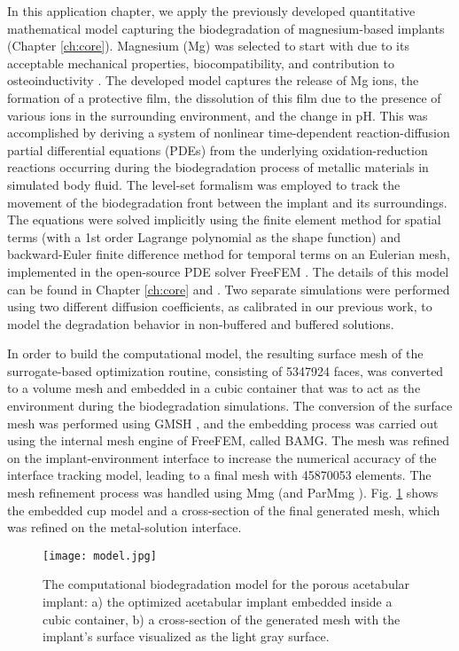 In this application chapter, we apply the previously developed quantitative mathematical model capturing the biodegradation of magnesium-based implants (Chapter \ref{ch:core}). Magnesium (Mg) was selected to start with due to its acceptable mechanical properties, biocompatibility, and contribution to osteoinductivity \cite{Agarwal2016}. The developed model captures the release of Mg ions, the formation of a protective film,  the dissolution of this film due to the presence of various ions in the surrounding environment, and the change in pH. This was accomplished by deriving a system of nonlinear time-dependent reaction-diffusion partial differential equations (\gls{PDE}s) from the underlying oxidation-reduction reactions occurring during the biodegradation process of metallic materials in simulated body fluid. The level-set formalism was employed to track the movement of the biodegradation front between the implant and its surroundings. The equations were solved implicitly using the finite element method for spatial terms (with a 1st order Lagrange polynomial as the shape function) and backward-Euler finite difference method for temporal terms on an Eulerian mesh, implemented in the open-source \gls{PDE} solver FreeFEM \cite{Hecht2012}. The details of this model can be found in Chapter \ref{ch:core} and  \cite{Barzegari2021}. Two separate simulations were performed using two different diffusion coefficients, as calibrated in our previous work, to model the degradation behavior in non-buffered and buffered solutions.

In order to build the computational model, the resulting surface mesh of the surrogate-based optimization routine, consisting of \num{5347924} faces, was converted to a volume mesh and embedded in a cubic container that was to act as the environment during the biodegradation simulations. The conversion of the surface mesh was performed using GMSH \cite{Geuzaine2009}, and the embedding process was carried out using the internal mesh engine of FreeFEM, called BAMG. The mesh was refined on the implant-environment interface to increase the numerical accuracy of the interface tracking model, leading to a final mesh with \num{45870053} elements. The mesh refinement process was handled using Mmg \cite{Dapogny2014} (and ParMmg \cite{balarac:hal-03344779}). Fig. \ref{fig:cup_model} shows the embedded cup model and a cross-section of the final generated mesh, which was refined on the metal-solution interface.



\begin{figure}[h]
\centering
\medskip
\texttt{[image: model.jpg]}
\caption[Computational biodegradation model for the porous acetabular implant]{The computational biodegradation model for the porous acetabular implant: a) the optimized acetabular implant embedded inside a cubic container, b) a cross-section of the generated mesh with the implant's surface visualized as the light gray surface.} \label{fig:cup_model}
\end{figure}

